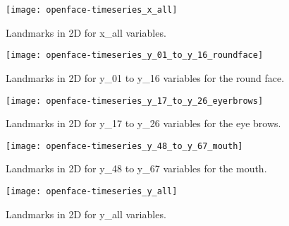 \documentclass[a4paper,12pt]{article}
\begin{document}
\begin{figure}
\centering
\texttt{[image: openface-timeseries\_x\_all]}
\caption{Landmarks in 2D for x\_all  variables.}
\end{figure}


\begin{figure}
\centering
\texttt{[image: openface-timeseries\_y\_01\_to\_y\_16\_roundface]}
\caption{Landmarks in 2D for y\_01 to y\_16 variables for the round face.}
\end{figure}

\begin{figure}
\centering
\texttt{[image: openface-timeseries\_y\_17\_to\_y\_26\_eyerbrows]}
\caption{Landmarks in 2D for y\_17 to y\_26 variables for the eye brows.}
\end{figure}


\begin{figure}
\centering
\texttt{[image: openface-timeseries\_y\_48\_to\_y\_67\_mouth]}
\caption{Landmarks in 2D for y\_48 to y\_67 variables for the mouth.}
\end{figure}

\begin{figure}
\centering
\texttt{[image: openface-timeseries\_y\_all]}
\caption{Landmarks in 2D for y\_all  variables.}
\end{figure}
\end{document}

